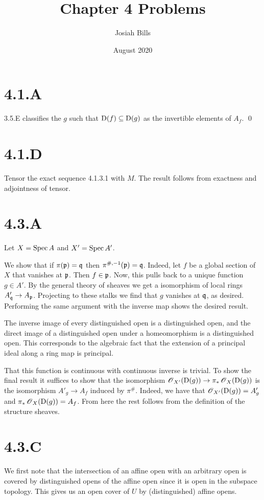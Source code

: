 \documentclass{article}
\title{Chapter 4 Problems}
\author{Josiah Bills}
\date{August 2020}
\begin{document}
\maketitle

\section{4.1.A}
3.5.E classifies the $g$ such that $\operatorname{D}(f) \subseteq \operatorname{D}(g)$ as the invertible elements of $A_f$. \qed

\section{4.1.D}
Tensor the exact sequence 4.1.3.1 with $M$. The result follows from exactness and adjointness of tensor.

\section{4.3.A}
Let $X=\operatorname{Spec} A$ and $X'=\operatorname{Spec} A'$.

We show that if $\pi(\mathfrak{p})=\mathfrak{q}$ then $\pi^{\#,-1}(\mathfrak{p})=\mathfrak{q}$. Indeed, let $f$ be a global section of $X$ that vanishes at $\mathfrak{p}$. Then $f \in \mathfrak{p}$. Now, this pulls back to a unique function $g \in A'$. By the general theory of sheaves we get a isomorphism of local rings $A'_{\mathfrak{q}} \to A_{\mathfrak{p}}$. Projecting to these stalks we find that $g$ vanishes at $\mathfrak{q}$, as desired. Performing the same argument with the inverse map shows the desired result.

The inverse image of every distinguished open is a distinguished open, and the direct image of a distinguished open under a homeomorphism is a distinguished open. This corresponds to the algebraic fact that the extension of a principal ideal along a ring map is principal.

That this function is continuous with continuous inverse is trivial. To show the final result it suffices to show that the isomorphism $\operatorname{\mathscr{O}}_{X'}(\operatorname{D}(g)) \to \pi_*\operatorname{\mathscr{O}}_X(\operatorname{D}(g))$ is the isomorphism $A'_g \to A_f$ induced by $\pi^{\#}$. Indeed, we have that $\operatorname{\mathscr{O}}_{X'}(\operatorname{D}(g))=A'_g$ and $\pi_*\operatorname{\mathscr{O}}_X(\operatorname{D}(g))=A_f$. From here the rest follows from the definition of the structure sheaves.

\section{4.3.C}
We first note that the intersection of an affine open with an arbitrary open is covered by distinguished opens of the affine open since it is open in the subspace topology. This gives us an open cover of $U$ by (distinguished) affine opens.
\end{document}
